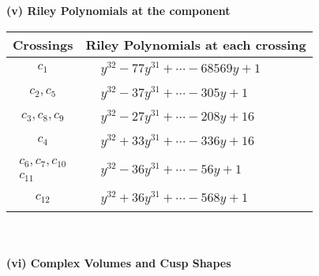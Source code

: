 \documentclass[1p]{elsarticle_modified}
\theoremstyle{definition}
\begin{document}
\newpage\renewcommand{\arraystretch}{1}
\flushleft \textbf{(v) Riley Polynomials at the component}\newline \\
\begin{tabular}{m{50pt}|m{274pt}}
Crossings & \hspace{64pt}Riley Polynomials at each crossing \\
\hline $$\begin{aligned}c_{1}\end{aligned}$$&$\begin{aligned}
&y^{32}-77 y^{31}+\cdots-68569 y+1
\end{aligned}$\\
\hline $$\begin{aligned}c_{2},c_{5}\end{aligned}$$&$\begin{aligned}
&y^{32}-37 y^{31}+\cdots-305 y+1
\end{aligned}$\\
\hline $$\begin{aligned}c_{3},c_{8},c_{9}\end{aligned}$$&$\begin{aligned}
&y^{32}-27 y^{31}+\cdots-208 y+16
\end{aligned}$\\
\hline $$\begin{aligned}c_{4}\end{aligned}$$&$\begin{aligned}
&y^{32}+33 y^{31}+\cdots-336 y+16
\end{aligned}$\\
\hline $$\begin{aligned}c_{6},c_{7},c_{10}\\c_{11}\end{aligned}$$&$\begin{aligned}
&y^{32}-36 y^{31}+\cdots-56 y+1
\end{aligned}$\\
\hline $$\begin{aligned}c_{12}\end{aligned}$$&$\begin{aligned}
&y^{32}+36 y^{31}+\cdots-568 y+1
\end{aligned}$\\
\hline
\end{tabular}\\~\\
\newpage\flushleft \textbf{(vi) Complex Volumes and Cusp Shapes}
\end{document}
